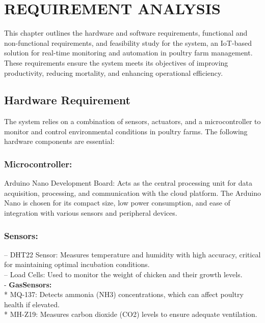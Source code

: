 \documentclass[../main.tex]{subfiles}
\begin{document}
\section{REQUIREMENT ANALYSIS}
 This chapter outlines the hardware and software requirements, functional and non-functional
 requirements, and feasibility study for the system, an IoT-based solution for real-time monitoring and automation in poultry farm management. These requirements ensure the system meets its objectives of improving productivity, reducing mortality,
 and enhancing operational efficiency.
\subsection{Hardware Requirement}
 The system relies on a combination of sensors, actuators, and a microcontroller to monitor and control environmental conditions in poultry farms. The following hardware components are essential:
    \subsubsection{\textbf{ Microcontroller:}}
    Arduino Nano Development Board: Acts as the central processing unit for data acquisition, processing, and communication with the cloud platform. The Arduino Nano is chosen for its compact size, low power consumption, and ease of integration with various sensors and peripheral devices.
              

    \subsubsection{\textbf{Sensors:}}
   – DHT22 Sensor: Measures temperature and humidity with high accuracy, critical
 for maintaining optimal incubation conditions.\\
 – Load Cells: Used to monitor the weight of chicken and their growth levels.\\
- \textbf{GasSensors:}\\
    * MQ-137: Detects ammonia (NH3) concentrations, which can affect poultry health if elevated.\\
    * MH-Z19: Measures carbon dioxide (CO2) levels to ensure adequate ventilation.
               
\end{document}
